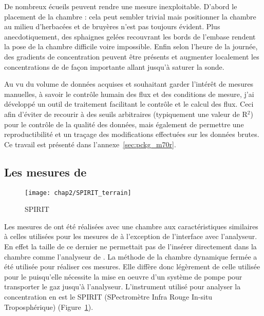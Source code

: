 De nombreux écueils peuvent rendre une mesure inexploitable. D'abord le placement de la chambre : cela peut sembler trivial mais positionner la chambre au milieu d'herbacées et de bruyères n'est pas toujours évident. 
Plus anecdotiquement, des sphaignes gelées recouvrant les bords de l'embase rendent la pose de la chambre difficile voire impossible. 
Enfin selon l'heure de la journée, des gradients de concentration peuvent être présents et augmenter localement les concentrations de \coo de façon importante allant jusqu'à saturer la sonde.

Au vu du volume de données acquises et souhaitant garder l'intérêt de mesures manuelles, à savoir le contrôle humain des flux et des conditions de mesure, j'ai développé un outil de traitement facilitant le contrôle et le calcul des flux.
Ceci afin d'éviter de recourir à des seuils arbitraires (typiquement une valeur de R$^{2}$) pour le contrôle de la qualité des données, mais également de permettre une reproductibilité et un traçage des modifications effectuées sur les données brutes.
Ce travail est présenté dans l'annexe~\ref{sec:pckg_m70r}.

\subsection{Les mesures de \texorpdfstring{\chh}{CH4}}

\begin{figure}
\texttt{[image: chap2/SPIRIT\_terrain]}
\caption{SPIRIT}
\label{fig:SPIRIT}
\end{figure}

Les mesures de \chh ont été réalisées avec une chambre aux caractéristiques similaires à celles utilisées pour les mesures de \coo à l'exception de l'interface avec l'analyseur.
En effet la taille de ce dernier ne permettait pas de l'insérer directement dans la chambre comme l'analyseur de \coo.
La méthode de la chambre dynamique fermée a été utilisée pour réaliser ces mesures.
Elle diffère donc légèrement de celle utilisée pour le \coo puisqu'elle nécessite la mise en oeuvre d'un système de pompe pour transporter le gaz jusqu'à l'analyseur.
L'instrument utilisé pour analyser la concentration en \chh est le SPIRIT (SPectromètre Infra Rouge In-situ Troposphérique) (Figure~\ref{fig:SPIRIT}).

